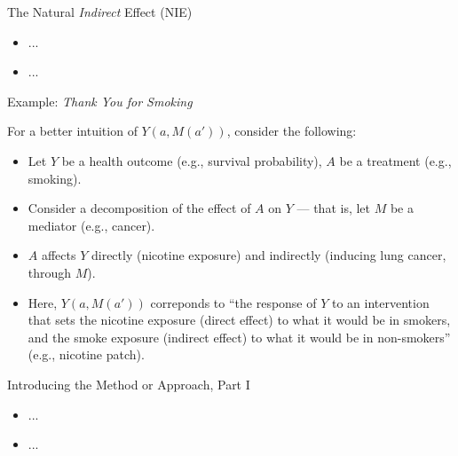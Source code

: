 \documentclass[12pt,t,handout]{beamer}
\begin{document}
\begin{frame}[c]{The Natural \textit{Indirect} Effect (NIE)}

\begin{center}
\begin{itemize}
  \item ...
  \item ...
\end{itemize}
\end{center}


\end{frame}


\begin{frame}[c]{Example: \textit{Thank You for Smoking}}

For a better intuition of $Y(a, M(a'))$, consider the following:

\begin{center}
\begin{itemize}
  \itemsep4pt
  \item Let $Y$ be a health outcome (e.g., survival probability), $A$ be a
    treatment (e.g., smoking).
  \item Consider a decomposition of the effect of $A$ on $Y$ --- that is, let
    $M$ be a mediator (e.g., cancer).
  \item $A$ affects $Y$ directly (nicotine exposure) and indirectly (inducing
    lung cancer, through $M$).
  \item Here, $Y(a, M(a'))$ correponds to ``the response of $Y$ to an
    intervention that sets the nicotine exposure (direct effect) to what it
    would be in smokers, and the smoke exposure (indirect effect) to what it
    would be in non-smokers'' (e.g., nicotine patch).
\end{itemize}
\end{center}


\end{frame}


\begin{frame}[c]{Introducing the Method or Approach, Part I}

\begin{center}
\begin{itemize}
  \item ...
  \item ...
\end{itemize}
\end{center}


\end{frame}
\end{document}

